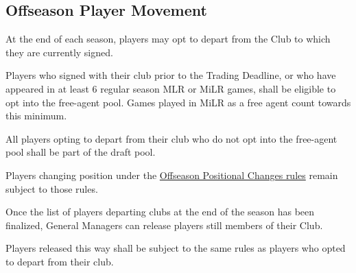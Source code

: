 \subsection{Offseason Player Movement}
\label{sec:OPM}
\begin{deepEnumerate}
	\item At the end of each season, players may opt to depart from the Club to which they are currently signed.
	\begin{deepEnumerate}
		\item Players who signed with their club prior to the Trading Deadline, or who have appeared in at least 6 regular season MLR or MiLR games, shall be eligible
		to opt into the free-agent pool. Games played in MiLR as a free agent count towards this minimum.
		\item All players opting to depart from their club who do not opt into the free-agent pool shall be part of the draft pool.
		\item Players changing position under the \hyperref[sec:OPC]{Offseason Positional Changes rules} remain subject to those rules.
	\end{deepEnumerate}
	\item Once the list of players departing clubs at the end of the season has been finalized, General Managers can release players still members of their Club.
	\begin{deepEnumerate}
		\item Players released this way shall be subject to the same rules as players who opted to depart from their club.
	\end{deepEnumerate}
\end{deepEnumerate}

